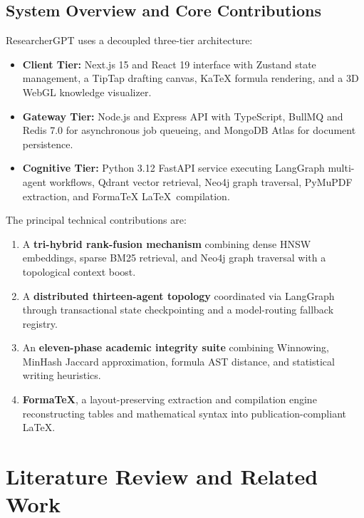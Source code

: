 \documentclass[conference]{IEEEtran}
\begin{document}
\subsection{System Overview and Core Contributions}
ResearcherGPT uses a decoupled three-tier architecture:
\begin{itemize}
\item \textbf{Client Tier:} Next.js 15 and React 19 interface with Zustand state management, a TipTap drafting canvas, KaTeX formula rendering, and a 3D WebGL knowledge visualizer.
\item \textbf{Gateway Tier:} Node.js and Express API with TypeScript, BullMQ and Redis 7.0 for asynchronous job queueing, and MongoDB Atlas for document persistence.
\item \textbf{Cognitive Tier:} Python 3.12 FastAPI service executing LangGraph multi-agent workflows, Qdrant vector retrieval, Neo4j graph traversal, PyMuPDF extraction, and FormaTeX \LaTeX\ compilation.
\end{itemize}

The principal technical contributions are:
\begin{enumerate}
\item A \textbf{tri-hybrid rank-fusion mechanism} combining dense HNSW embeddings, sparse BM25 retrieval, and Neo4j graph traversal with a topological context boost.
\item A \textbf{distributed thirteen-agent topology} coordinated via LangGraph through transactional state checkpointing and a model-routing fallback registry.
\item An \textbf{eleven-phase academic integrity suite} combining Winnowing, MinHash Jaccard approximation, formula AST distance, and statistical writing heuristics.
\item \textbf{FormaTeX}, a layout-preserving extraction and compilation engine reconstructing tables and mathematical syntax into publication-compliant \LaTeX.
\end{enumerate}

\section{Literature Review and Related Work}
\end{document}
